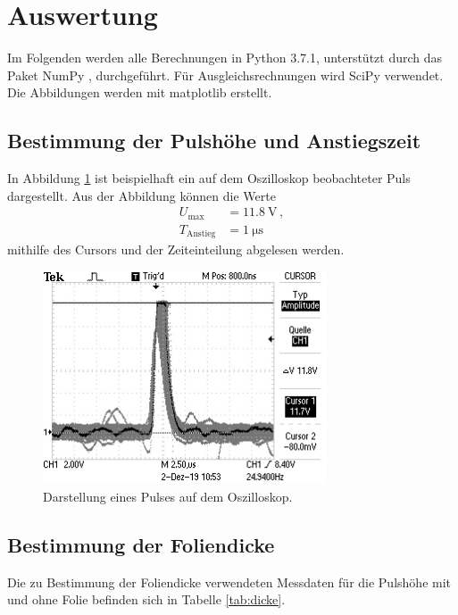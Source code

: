 \section{Auswertung}
\label{sec:Auswertung}

Im Folgenden werden alle Berechnungen in Python 3.7.1, unterstützt durch das
Paket NumPy \cite{numpy}, durchgeführt. Für Ausgleichsrechnungen wird SciPy
\cite{scipy} verwendet. Die Abbildungen werden mit matplotlib \cite{matplotlib} erstellt.

\subsection{Bestimmung der Pulshöhe und Anstiegszeit}
\label{subsec:puls}

In Abbildung \ref{fig:puls} ist beispielhaft ein auf dem Oszilloskop beobachteter Puls
dargestellt. Aus der Abbildung können die Werte
\begin{align*}
  U_\text{max}&= \SI{11.8}{\volt}\,,\\
  T_\text{Anstieg}&= \SI{1}{\micro\second}
\end{align*}
mithilfe des Cursors und der Zeiteinteilung abgelesen werden.

\begin{figure}
  \centering
  \includegraphics[width=0.75\textwidth]{images/peak.JPG}
  \caption{Darstellung eines Pulses auf dem Oszilloskop.}
  \label{fig:puls}
\end{figure}

\subsection{Bestimmung der Foliendicke}
\label{subsec:dicke}

Die zu Bestimmung der Foliendicke verwendeten Messdaten für die Pulshöhe
mit und ohne Folie befinden sich in Tabelle \ref{tab:dicke}.

